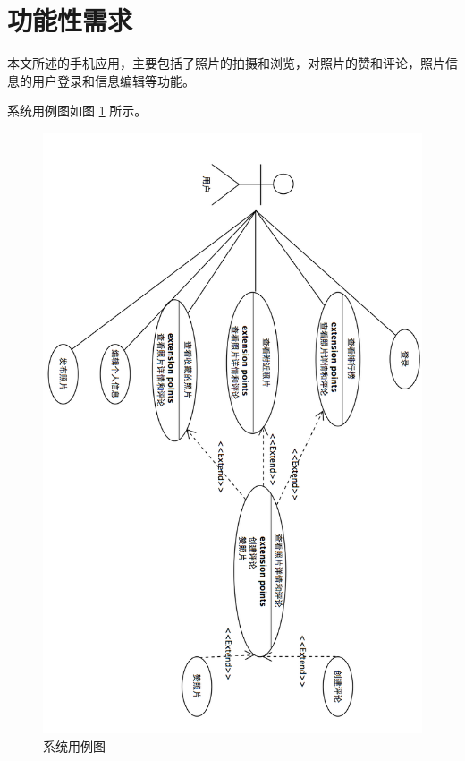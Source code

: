 \section{功能性需求}

本文所述的手机应用，主要包括了照片的拍摄和浏览，对照片的赞和评论，照片信息的用户登录和信息编辑等功能。

系统用例图如图 \ref{use-case-diagram} 所示。

\begin{figure}[h!]
    \centering
    \includegraphics[width=400pt]{figure/use_case_diagram.png}
    \caption{系统用例图}
    \label{use-case-diagram}
\end{figure}

